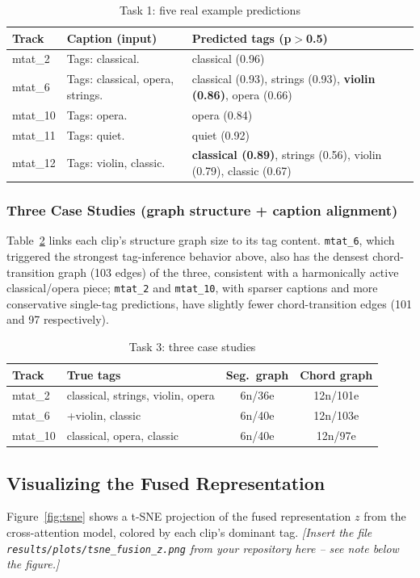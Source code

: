 \documentclass[conference]{IEEEtran}
\begin{document}
\begin{table}[h]
\centering
\caption{Task 1: five real example predictions}
\label{tab:examples}
\small
\begin{tabular}{p{1.3cm}p{2.6cm}p{3.6cm}}
\toprule
Track & Caption (input) & Predicted tags (p$>$0.5) \\
\midrule
mtat\_2 & Tags: classical. & classical (0.96) \\
mtat\_6 & Tags: classical, opera, strings. & classical (0.93), strings (0.93), \textbf{violin (0.86)}, opera (0.66) \\
mtat\_10 & Tags: opera. & opera (0.84) \\
mtat\_11 & Tags: quiet. & quiet (0.92) \\
mtat\_12 & Tags: violin, classic. & \textbf{classical (0.89)}, strings (0.56), violin (0.79), classic (0.67) \\
\bottomrule
\end{tabular}
\end{table}

\subsubsection{Three Case Studies (graph structure + caption alignment)}
Table~\ref{tab:casestudies} links each clip's structure graph size to
its tag content. \texttt{mtat\_6}, which triggered the strongest
tag-inference behavior above, also has the densest chord-transition
graph (103 edges) of the three, consistent with a harmonically active
classical/opera piece; \texttt{mtat\_2} and \texttt{mtat\_10}, with
sparser captions and more conservative single-tag predictions, have
slightly fewer chord-transition edges (101 and 97 respectively).

\begin{table}[htbp]
\centering
\caption{Task 3: three case studies}
\label{tab:casestudies}
\small
\begin{tabular}{l p{} c c}
\toprule
Track & True tags & Seg.\ graph & Chord graph \\
\midrule
mtat\_2 & classical, strings, violin, opera & 6n/36e & 12n/101e \\
mtat\_6 & +violin, classic & 6n/40e & 12n/103e \\
mtat\_10 & classical, opera, classic & 6n/40e & 12n/97e \\
\bottomrule
\end{tabular}
\end{table}

\subsection{Visualizing the Fused Representation}
Figure~\ref{fig:tsne} shows a t-SNE projection of the fused
representation $z$ from the cross-attention model, colored by each
clip's dominant tag. \emph{[Insert the file
\texttt{results/plots/tsne\_fusion\_z.png} from your repository here --
see note below the figure.]}
\end{document}
